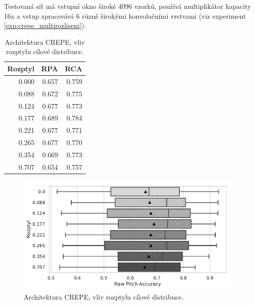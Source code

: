 
Testovaná síť má vstupní okno široké 4096 vzorků, používá multiplikátor kapacity 16x a vstup zpracovává 6 různě širokými konvolučními vrstvami (viz experiment \ref{exp:crepe_multirozliseni}).


\begin{table}[h!]
\centering
    \begin{tabular}{rrr}
    \toprule
    Rozptyl &   RPA &   RCA \\
    \midrule
    0.000 & 0.657 & 0.759 \\
    0.088 & 0.672 & 0.775 \\
    0.124 & 0.677 & 0.773 \\
    0.177 & 0.689 & 0.784 \\
    0.221 & 0.677 & 0.771 \\
    0.265 & 0.677 & 0.770 \\
    0.354 & 0.669 & 0.773 \\
    0.707 & 0.654 & 0.757 \\
    \bottomrule
    \end{tabular}

\caption{Architektura CREPE, vliv rozptylu cílové distribuce.}\label{tab:crepe_diskretizace}
\end{table}

\begin{figure}[h]\centering
    \includegraphics[scale=0.6]{../img/figures/crepe_rozptyl_grey}
\caption{Architektura CREPE, vliv rozptylu cílové distribuce.}\label{obr:crepe_diskretizace}
\end{figure}

